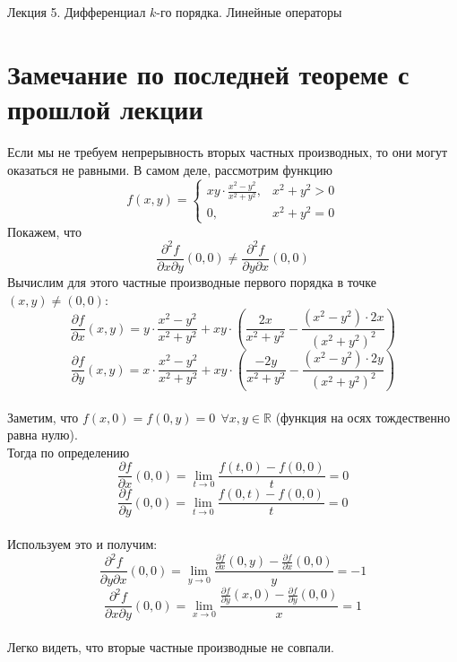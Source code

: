 \documentclass[11pt]{article}
\begin{document}
\begin{titlepage}
    \centering
    \vspace*{\fill}  %

    {\Huge Лекция 5. Дифференциал $k$-го порядка. Линейные операторы
    \par}

    \vspace*{\fill}  %
\end{titlepage}

\setcounter{page}{1}

\section{Замечание по последней теореме с прошлой лекции}

\begin{remark}
    Если мы не требуем непрерывность вторых частных производных, то они могут оказаться не равными.
    В самом деле, рассмотрим функцию \[f(x, y) = 
    \begin{cases}
        \displaystyle xy \cdot \frac{x^2 - y^2}{x^2 + y^2}, & x^2 + y^2 > 0 \\
        0, & x^2 + y^2 = 0
    \end{cases}\]
    Покажем, что \[\frac{\partial^2f}{\partial x \partial y}(0, 0) \neq 
    \frac{\partial^2f}{\partial y \partial x}(0, 0)\]
    Вычислим для этого частные производные первого порядка в точке $(x, y) \neq (0, 0):$ 
    \[\frac{\partial f}{\partial x}(x, y) = y \cdot \frac{x^2 - y^2}
    {x^2 + y^2} + xy \cdot \left( \frac{2x}{x^2 + y^2} - \frac{(x^2 - y^2) 
    \cdot 2x}{(x^2 + y^2)^2} \right)\]
    \[\frac{\partial f}{\partial y}(x, y) = x \cdot \frac{x^2 - y^2}
    {x^2 + y^2} + xy \cdot \left( \frac{-2y}{x^2 + y^2} - \frac{(x^2 - y^2) 
    \cdot 2y}{(x^2 + y^2)^2} \right)\] \\
    Заметим, что $f(x, 0) = f(0, y) = 0 \ \ \forall x, y \in \mathbb{R}$ 
    (функция на осях тождественно равна нулю). \\
    Тогда по определению \[\frac{\partial f}{\partial x}(0, 0) = \lim_{t \to 0} 
    \frac{f(t, 0) - f(0, 0)}{t} = 0\] 
    \[\frac{\partial f}{\partial y}(0, 0) = \lim_{t \to 0} \frac{f(0, t) 
    - f(0, 0)}{t} = 0\] \\
    Используем это и получим: 
    \[\frac{\partial^2 f}{\partial y \partial x}(0, 0) = 
    \lim_{y \to 0} \frac{\displaystyle \frac{\partial f}{\partial x}(0, y) - 
    \frac{\partial f}{\partial x}(0, 0)}{y} = -1\]
    \[\frac{\partial^2 f}{\partial x \partial y}(0, 0) = 
    \lim_{x \to 0} \frac{\displaystyle \frac{\partial f}{\partial y}(x, 0) - 
    \frac{\partial f}{\partial y}(0, 0)}{x} = 1\] \\
    Легко видеть, что вторые частные производные не совпали.
\end{remark}
\end{document}
